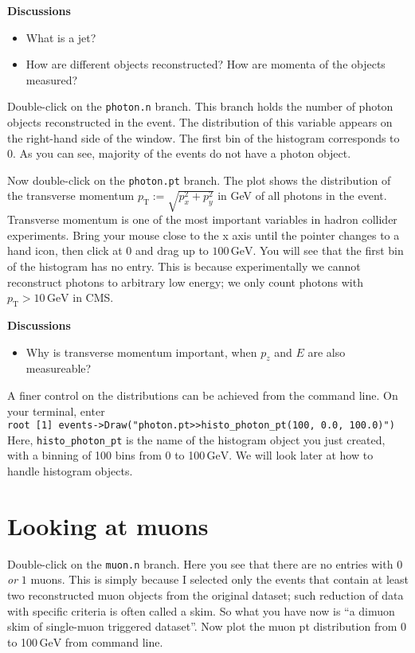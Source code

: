 \documentclass[12pt]{article}
\newcommand{\rterminal}[2]{\vspace{3pt}\texttt{root [#1] #2} \\}
\newcommand{\GeV}{\ensuremath{\,\mathrm{GeV}}\xspace}
\newcommand{\pt}{\ensuremath{p_{\mathrm{T}}}\xspace}
\newenvironment{discussions}{%
\vspace{0.2in}%
\textbf{Discussions}%
\begin{itemize}%
}{%
\end{itemize}%
}
\begin{document}
\begin{discussions}
\item What is a jet?
\item How are different objects reconstructed? How are momenta of the objects measured?
\end{discussions}

Double-click on the \texttt{photon.n} branch. This branch holds the number of photon objects reconstructed in the event. The distribution of this variable appears on the right-hand side of the window. The first bin of the histogram corresponds to $0$. As you can see, majority of the events do not have a photon object.

Now double-click on the \texttt{photon.pt} branch. The plot shows the distribution of the transverse momentum $\pt := \sqrt{p_{x}^2 + p_{y}^2}$ in GeV of all photons in the event. Transverse momentum is one of the most important variables in hadron collider experiments. Bring your mouse close to the x axis until the pointer changes to a hand icon, then click at $0$ and drag up to $100\GeV$. You will see that the first bin of the histogram has no entry. This is because experimentally we cannot reconstruct photons to arbitrary low energy; we only count photons with $\pt > 10\GeV$ in CMS.

\begin{discussions}
\item Why is transverse momentum important, when $p_{z}$ and $E$ are also measureable?
\end{discussions}

A finer control on the distributions can be achieved from the command line. On your terminal, enter \\
\rterminal{1}{events->Draw("photon.pt>>histo\_photon\_pt(100, 0.0, 100.0)")}
Here, \texttt{histo\_photon\_pt} is the name of the histogram object you just created, with a binning of 100 bins from 0 to 100\GeV. We will look later at how to handle histogram objects.

\section{Looking at muons}
Double-click on the \texttt{muon.n} branch. Here you see that there are no entries with $0$ \textit{or} $1$ muons. This is simply because I selected only the events that contain at least two reconstructed muon objects from the original dataset; such reduction of data with specific criteria is often called a skim. So what you have now is ``a dimuon skim of single-muon triggered dataset''. Now plot the muon pt distribution from 0 to 100\GeV from command line.
\end{document}
